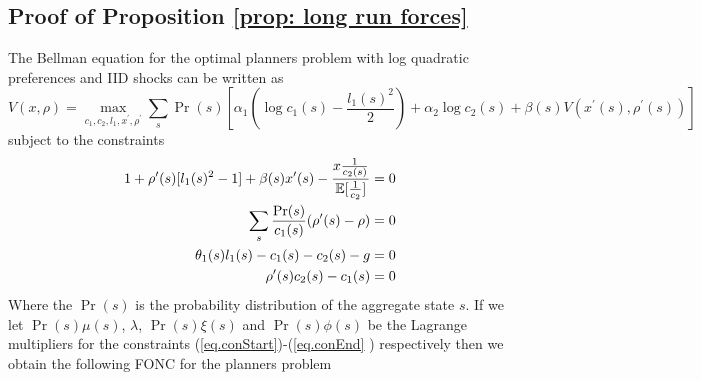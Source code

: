 \documentclass[thmsb,11pt]{article}
\begin{document}
\subsection{Proof of Proposition \protect\ref{prop: long run forces}}

The Bellman equation for the optimal planners problem with log quadratic
preferences and IID shocks can be written as
\begin{equation*}
V(x,\rho) = \max_{c_1,c_2,l_1,x^{\prime },\rho^{\prime }} \sum_s \Pr(s)\left[%
\alpha_1\left(\log c_1(s) -\frac{l_1(s)^2}{2}\right)+\alpha_2\log
c_2(s)+\beta(s) V(x^{\prime }(s),\rho^{\prime }(s))\right]
\end{equation*}%
subject to the constraints
\begin{align}
1+\rho^{\prime }(s)[l_1(s)^2-1]+\beta(s)x^{\prime }(s) - \frac{x\frac{1}{%
c_2(s)}}{\mathbb{E}[\frac1{c_2}]}=0  \label{eq.conStart} \\
\sum_s\frac{\Pr(s)}{c_1(s)}(\rho^{\prime }(s)-\rho) = 0 \\
\theta_1(s)l_1(s) -c_1(s)-c_2(s)-g = 0 \\
\rho^{\prime }(s) c_2(s)-c_1(s) = 0  \label{eq.conEnd}
\end{align}
Where the $\Pr(s)$ is the probability distribution of the aggregate state $s$. If
we let $\Pr(s)\mu(s)$, $\lambda$, $\Pr(s)\xi(s)$ and $\Pr(s)\phi(s)$ be the
Lagrange multipliers for the constraints (\ref{eq.conStart})-(\ref{eq.conEnd}%
) respectively then we obtain the following FONC for the planners problem
\end{document}
